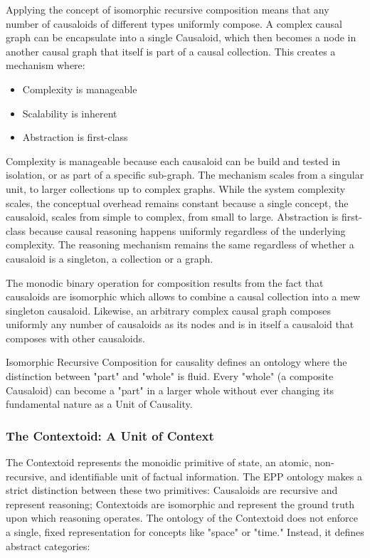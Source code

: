 Applying the concept of isomorphic recursive composition means that any number of causaloids of different types uniformly compose. A complex causal graph can be encapsulate into a single Causaloid, which then becomes a node in another causal graph that itself is part of a causal collection. This creates a mechanism where:

\begin{itemize}
	\item Complexity is manageable
	\item Scalability is inherent
	\item Abstraction is first-class
\end{itemize}

Complexity is manageable because each causaloid can be build and tested in isolation, or as part of a specific sub-graph. The mechanism scales from a singular unit, to larger collections up to complex graphs. While the system complexity scales, the conceptual overhead remains constant because a single concept, the causaloid, scales from simple to complex, from small to large. Abstraction is first-class because causal reasoning happens uniformly regardless of the underlying complexity. The reasoning mechanism remains the same regardless of whether a causaloid is a singleton, a collection or a graph.

The monodic binary operation for composition results from the fact that causaloids are isomorphic which allows to combine a causal collection into a mew singleton causaloid. Likewise, an arbitrary complex causal graph composes uniformly any number of causaloids as its nodes and is in itself a causaloid that composes with other causaloids. 

Isomorphic Recursive Composition for causality defines an ontology where the distinction between "part" and "whole" is fluid. Every "whole" (a composite Causaloid) can become a "part" in a larger whole without ever changing its fundamental nature as a Unit of  Causality.

\subsubsection{The Contextoid: A Unit of Context}
\label{sec:ontology_contextoid}

The Contextoid represents the monoidic primitive of state, an atomic, non-recursive, and identifiable unit of factual information. The EPP ontology makes a strict distinction between these two primitives: Causaloids are recursive and represent reasoning; Contextoids are isomorphic and represent the ground truth upon which reasoning operates. The ontology of the Contextoid does not enforce a single, fixed representation for concepts like "space" or "time." Instead, it defines abstract categories:

